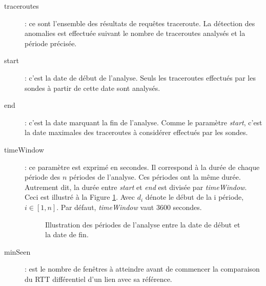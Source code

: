 \begin{description}
	\item[traceroutes] : ce sont l'ensemble des résultats de requêtes traceroute. La détection des anomalies est effectuée suivant le nombre de traceroutes analysés et la période précisée. 
	\item[start] : c'est la date de début de l'analyse. Seuls les traceroutes effectués par les sondes  à partir de cette date sont analysés.
	\item[end]  : c'est la date marquant la fin de l'analyse. Comme le paramètre \textit{start}, c'est la date maximales des  traceroutes à considérer effectués par les sondes.
	\item[timeWindow]:  ce paramètre est exprimé en secondes. Il correspond à la durée de chaque période des $n$ périodes de l'analyse. Ces périodes ont la même durée. Autrement dit, la durée entre   \textit{start} et \textit{end} est divisée par \textit{timeWindow}. Ceci est illustré à la Figure  \ref{fig:timing_tex_}. Avec $d_i$ dénote le début de la i période,  $i \in [1,n]$. Par défaut, \textit{timeWindow} vaut $ 3600 $ secondes. 
	\begin{figure}[h]
		\centering
		\captionsetup{justification=centering}
		
		\caption{Illustration des périodes de l'analyse entre la date de début et la date de fin.}
		\label{fig:timing_tex_}
	\end{figure}
	\item[minSeen] : est le nombre de fenêtres à atteindre avant de commencer la comparaison du RTT différentiel d'un lien avec sa référence. 
	

\end{description}
